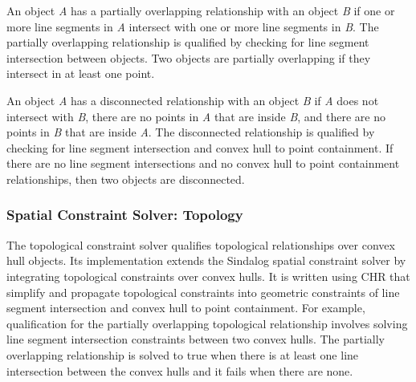 \documentclass[12pt]{ucthesis}
\begin{document}
An object \emph{A} has a partially overlapping relationship with an object \emph{B} if one or more line segments in \emph{A} intersect with one or more line segments in \emph{B}. The partially overlapping relationship is qualified by checking for line segment intersection between objects. Two objects are partially overlapping if they intersect in at least one point.  

An object \emph{A} has a disconnected relationship with an object \emph{B} if \emph{A} does not intersect with \emph{B}, there are no points in \emph{A} that are inside \emph{B}, and there are no points in \emph{B} that are inside \emph{A}. The disconnected relationship is qualified by checking for line segment intersection and convex hull to point containment. If there are no line segment intersections and no convex hull to point containment relationships, then two objects are disconnected.  

\subsubsection{Spatial Constraint Solver: Topology}
The topological constraint solver qualifies topological relationships over convex hull objects. Its implementation extends the Sindalog \cite{Almendros-Jimenez} spatial constraint solver by integrating topological constraints over convex hulls. It is written using CHR that simplify and propagate topological constraints into geometric constraints of line segment intersection and convex hull to point containment. For example, qualification for the partially overlapping topological relationship involves solving line segment intersection constraints between two convex hulls. The partially overlapping relationship is solved to true when there is at least one line intersection between the convex hulls and it fails when there are none. 


\end{document}
